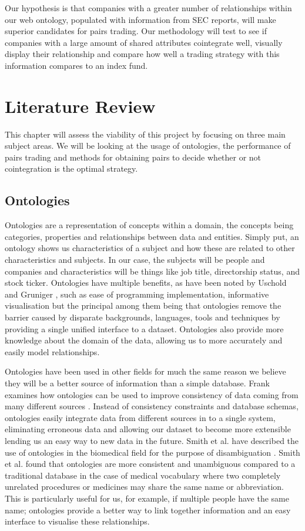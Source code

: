 \documentclass{UoYCSproject}
\begin{document}
Our hypothesis is that companies with a greater number of relationships within our web ontology, populated with information from SEC reports, will make superior candidates for pairs trading. Our methodology will test to see if companies with a large amount of shared attributes cointegrate well, visually display their relationship and compare how well a trading strategy with this information compares to an index fund.

\chapter{Literature Review}
\label{cha:Literature Review}

This chapter will assess the viability of this project by focusing on three main subject areas. We will be looking at the usage of ontologies, the performance of pairs trading and methods for obtaining pairs to decide whether or not cointegration is the optimal strategy.

\section{Ontologies}

Ontologies are a representation of concepts within a domain, the concepts being categories, properties and relationships between data and entities. Simply put, an ontology shows us characteristics of a subject and how these are related to other characteristics and subjects. In our case, the subjects will be people and companies and characteristics will be things like job title, directorship status, and stock ticker. Ontologies have multiple benefits, as have been noted by Uschold and Gruniger \parencite{ontdef}, such as ease of programming implementation, informative visualisation but the principal among them being that ontologies remove the barrier caused by disparate backgrounds, languages, tools and techniques by providing a single unified interface to a dataset. Ontologies also provide more knowledge about the domain of the data, allowing us to more accurately and easily model relationships.

Ontologies have been used in other fields for much the same reason we believe they will be a better source of information than a simple database. Frank examines how ontologies can be used to improve consistency of data coming from many different sources \parencite{ontgeog}. Instead of consistency constraints and database schemas, ontologies easily integrate data from different sources in to a single system, eliminating erroneous data and allowing our dataset to become more extensible lending us an easy way to new data in the future. Smith et al. have described the use of ontologies in the biomedical field for the purpose of disambiguation \parencite{ontbio}. Smith et al. found that ontologies are more consistent and unambiguous compared to a traditional database in the case of medical vocabulary where two completely unrelated procedures or medicines may share the same name or abbreviation. This is particularly useful for us, for example, if multiple people have the same name; ontologies provide a better way to link together information and an easy interface to visualise these relationships.
\end{document}
